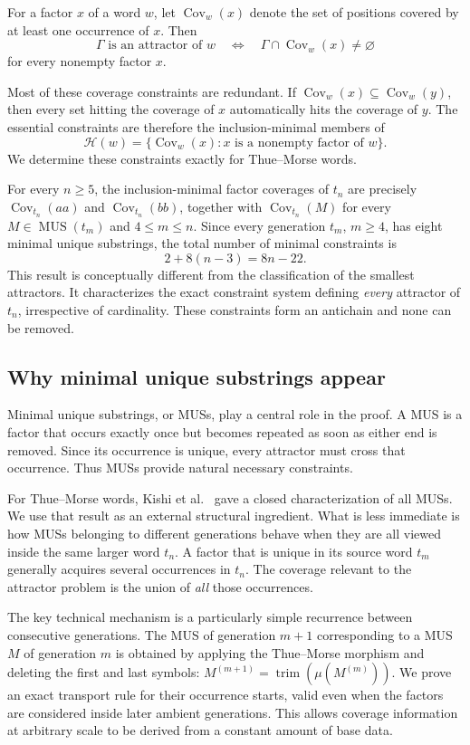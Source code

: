 \documentclass[10pt,a4paper]{article}
\theoremstyle{definition}\newtheorem{definition}[theorem]{Definition}
\theoremstyle{remark}\newtheorem{remark}[theorem]{Remark}
\newcommand{\Cov}{\operatorname{Cov}}
\newcommand{\MUS}{\operatorname{MUS}}
\begin{document}
For a factor $x$ of a word $w$, let $\Cov_w(x)$ denote the set of positions covered by at least one occurrence of $x$. Then
\[
\Gamma\text{ is an attractor of }w
\quad\Longleftrightarrow\quad
\Gamma\cap\Cov_w(x)\neq\varnothing
\]
for every nonempty factor $x$.

Most of these coverage constraints are redundant. If $\Cov_w(x)\subseteq\Cov_w(y)$, then every set hitting the coverage of $x$ automatically hits the coverage of $y$. The essential constraints are therefore the inclusion-minimal members of
\[
\mathcal H(w)=\{\Cov_w(x):x\text{ is a nonempty factor of }w\}.
\]
We determine these constraints exactly for Thue--Morse words.

For every $n\geq5$, the inclusion-minimal factor coverages of $t_n$ are precisely $\Cov_{t_n}(aa)$ and $\Cov_{t_n}(bb)$, together with $\Cov_{t_n}(M)$ for every $M\in\MUS(t_m)$ and $4\leq m\leq n$. Since every generation $t_m$, $m\geq4$, has eight minimal unique substrings, the total number of minimal constraints is
\[
2+8(n-3)=8n-22.
\]
This result is conceptually different from the classification of the smallest attractors. It characterizes the exact constraint system defining \emph{every} attractor of $t_n$, irrespective of cardinality. These constraints form an antichain and none can be removed.

\subsection{Why minimal unique substrings appear}
Minimal unique substrings, or MUSs, play a central role in the proof. A MUS is a factor that occurs exactly once but becomes repeated as soon as either end is removed. Since its occurrence is unique, every attractor must cross that occurrence. Thus MUSs provide natural necessary constraints.

For Thue--Morse words, Kishi et al.~\cite{Kishi2026} gave a closed characterization of all MUSs. We use that result as an external structural ingredient. What is less immediate is how MUSs belonging to different generations behave when they are all viewed inside the same larger word $t_n$. A factor that is unique in its source word $t_m$ generally acquires several occurrences in $t_n$. The coverage relevant to the attractor problem is the union of \emph{all} those occurrences.

The key technical mechanism is a particularly simple recurrence between consecutive generations. The MUS of generation $m+1$ corresponding to a MUS $M$ of generation $m$ is obtained by applying the Thue--Morse morphism and deleting the first and last symbols:
$
M^{(m+1)}=\operatorname{trim}\!\left(\mu(M^{(m)})\right).
$
We prove an exact transport rule for their occurrence starts, valid even when the factors are considered inside later ambient generations. This allows coverage information at arbitrary scale to be derived from a constant amount of base data.
\end{document}

